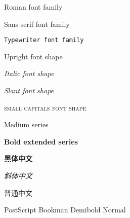 \documentclass[UTF8]{article}
\begin{document}
\textrm{Roman font family}

\textsf{Sans serif font family}

\texttt{Typewriter font family}

\textup{Upright font shape}

\textit{Italic font shape}

\textsl{Slant font shape}

\textsc{small capitals font shape}

\textmd{Medium series}

\textbf{Bold extended series}

\textbf{黑体中文}

\textit{斜体中文}

普通中文

PostScript Bookman Demibold Normal
\end{document}
